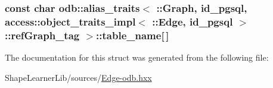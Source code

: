 \subsubsection[{table\+\_\+name}]{\setlength{\rightskip}{0pt plus 5cm}const char odb\+::alias\+\_\+traits$<$ \+::{\bf Graph}, id\+\_\+pgsql, access\+::object\+\_\+traits\+\_\+impl$<$ \+::{\bf Edge}, id\+\_\+pgsql $>$\+::ref\+Graph\+\_\+tag $>$\+::table\+\_\+name\mbox{[}$\,$\mbox{]}\hspace{0.3cm}{\ttfamily [static]}}\label{structodb_1_1alias__traits_3_01_1_1_graph_00_01id__pgsql_00_01access_1_1object__traits__impl_3_0b3284584314bfa017251cf7444a96ae4_a136c7131f00c7ce09f6187c95f70dcb3}


The documentation for this struct was generated from the following file\+:\begin{DoxyCompactItemize}
\item 
Shape\+Learner\+Lib/sources/\hyperlink{_edge-odb_8hxx}{Edge-\/odb.\+hxx}\end{DoxyCompactItemize}
